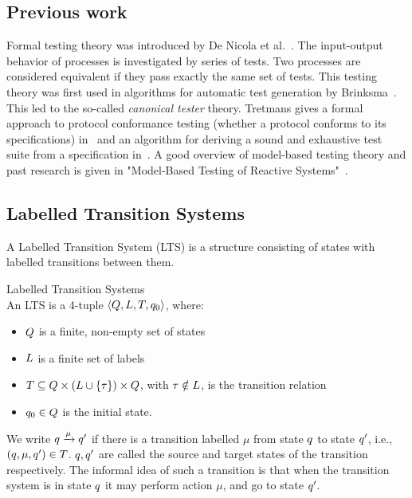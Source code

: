 \subsection{Previous work}
Formal testing theory was introduced by De Nicola et al.~\cite{denicola:testing}. The input-output behavior of processes is investigated by series of tests. Two processes are considered equivalent if they pass exactly the same set of tests. This testing theory was first used in algorithms for automatic test generation by Brinksma~\cite{brinksma:testgeneration}. This led to the so-called \textit{canonical tester} theory. Tretmans gives a formal approach to protocol conformance testing (whether a protocol conforms to its specifications) in~\cite{Tretmans:conformancetesting} and an algorithm for deriving a sound and exhaustive test suite from a specification in~\cite{Tretmans:testgeneration}. A good overview of model-based testing theory and past research is given in "Model-Based Testing of Reactive Systems"~\cite{Broy:ModelBasedTesting}.

\subsection{Labelled Transition Systems}
A Labelled Transition System (LTS) is a structure consisting of states with labelled transitions between them.
\vspace{5px}
\begin{definition} Labelled Transition Systems \\
An LTS is a 4-tuple	$\langle Q, L, T, q_0\rangle$, where:
\begin{itemize}
\item $Q$  is a finite, non-empty set of states
\item $L$  is a finite set of labels
\item {} $T \subseteq Q \times (L \cup \{\tau\}) \times Q$, with $\tau \notin L$, is the transition relation
\item {} $q_0 \in Q$ is the initial state.
\end{itemize}
We write $q \xrightarrow{\mu}q'$ if there is a transition labelled $\mu$ from state $q$ to state $q'$, i.e., $(q, \mu, q') \in T$. $q, q'$ are called the source and target states of the transition respectively. The informal idea of such a transition is that when the transition system is in state $q$ it may perform action $\mu$, and go to state $q'$.
\end{definition}

